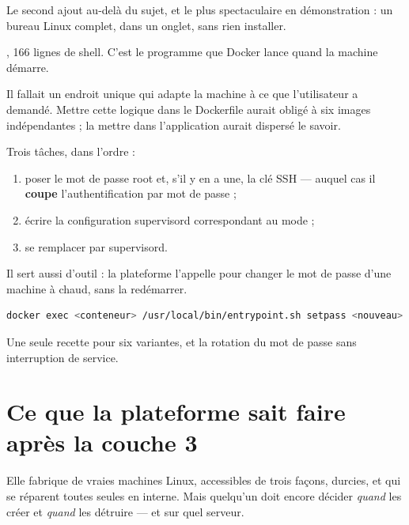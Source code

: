 \apport
Le second ajout au-delà du sujet, et le plus spectaculaire en démonstration : un
bureau Linux complet, dans un onglet, sans rien installer.


\quoi
{}, 166 lignes de shell. C'est le programme que
Docker lance quand la machine démarre.

\pourquoi
Il fallait un endroit unique qui adapte la machine à ce que l'utilisateur a
demandé. Mettre cette logique dans le Dockerfile aurait obligé à six images
indépendantes ; la mettre dans l'application aurait dispersé le savoir.

\role
Trois tâches, dans l'ordre :

\begin{enumerate}
\item poser le mot de passe root et, s'il y en a une, la clé SSH --- auquel cas
  il \textbf{coupe} l'authentification par mot de passe ;
\item écrire la configuration supervisord correspondant au mode ;
\item se remplacer par supervisord.
\end{enumerate}

Il sert aussi d'outil : la plateforme l'appelle pour changer le mot de passe
d'une machine à chaud, sans la redémarrer.

\begin{lstlisting}[language=bash]
docker exec <conteneur> /usr/local/bin/entrypoint.sh setpass <nouveau>
\end{lstlisting}

\apport
Une seule recette pour six variantes, et la rotation du mot de passe sans
interruption de service.

\section*{Ce que la plateforme sait faire après la couche 3}

Elle fabrique de vraies machines Linux, accessibles de trois façons, durcies, et
qui se réparent toutes seules en interne. Mais quelqu'un doit encore décider
\emph{quand} les créer et \emph{quand} les détruire --- et sur quel serveur.
